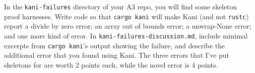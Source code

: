 In the \texttt{kani-failures} directory of your A3 repo, you will find some skeleton proof harnesses.
Write code so that \texttt{cargo kani} will make Kani (and not \texttt{rustc}) report a divide by zero error; an array out of bounds error; a unwrap-None error;
and one more kind of error. In \texttt{kani-failures-discussion.md}, include minimal excerpts from \texttt{cargo kani}'s output showing the failure, and
describe the additional error that you found using Kani. The three errors that I've put skeletons for are worth 2 points each, while the novel error is 4 points.
